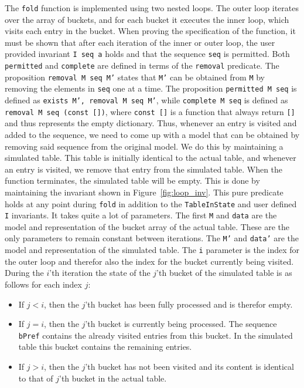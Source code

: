 \documentclass[10pt,a4paper]{article}
\begin{document}
The \texttt{fold} function is implemented using two nested loops. The outer loop iterates over the array of buckets, and for each bucket it executes the inner loop, which visits each entry in the bucket. When proving the specification of the function, it must be shown that after each iteration of the inner or outer loop, the user provided invariant \texttt{I seq a} holds and that the sequence \texttt{seq} is permitted. Both \texttt{permitted} and \texttt{complete} are defined in terms of the \texttt{removal} predicate. The proposition \texttt{removal M seq M'} states that \texttt{M'} can be obtained from \texttt{M} by removing the elements in \texttt{seq} one at a time. The proposition \texttt{permitted M seq} is defined as \texttt{exists M', removal M seq M'}, while \texttt{complete M seq} is defined as \texttt{removal M seq (const [])}, where \texttt{const []} is a function that always return \texttt{[]} and thus represents the empty dictionary. Thus, whenever an entry is visited and added to the sequence, we need to come up with a model that can be obtained by removing said sequence from the original model. We do this by maintaining a simulated table. This table is initially identical to the actual table, and whenever an entry is visited, we remove that entry from the simulated table. When the function terminates, the simulated table will be empty. This is done by maintaining the invariant shown in Figure~\ref{fig:loop_inv}. This pure predicate holds at any point during \texttt{fold} in addition to the \texttt{TableInState} and user defined \texttt{I} invariants. It takes quite a lot of parameters. The first \texttt{M} and \texttt{data} are the model and representation of the bucket array of the actual table. These are the only parameters to remain constant between iterations. The \texttt{M'} and \texttt{data'} are the model and representation of the simulated table. The \texttt{i} parameter is the index for the outer loop and therefor also the index for the bucket currently being visited. During the $i$'th iteration the state of the $j$'th bucket of the simulated table is as follows for each index $j$:
\begin{itemize}
\item If $j < i$, then the $j$'th bucket has been fully processed and is therefor empty.
\item If $j = i$, then the $j$'th bucket is currently being processed. The sequence \texttt{bPref} contains the already visited entries from this bucket. In the simulated table this bucket contains the remaining entries.
\item If $j > i$, then the $j$'th bucket has not been visited and its content is identical to that of $j$'th bucket in the actual table.
\end{itemize}
\end{document}
